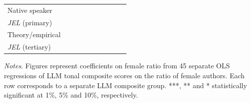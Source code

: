 \begin{table}
\begin{threeparttable}
\begin{tabular}{p{3cm}S@{}S@{}S@{}S@{}S@{}S@{}S@{}S@{}S@{}}
            Native speaker                &               &               &               &               &           {}   &           {}   &           {}   &           {}   &           {}   \\
            \textit{JEL} (primary)        &               &               &               &               &               &               &           {}   &               &               \\
            Theory/empirical              &               &               &               &               &               &               &               &           {}   &               \\
            \textit{JEL} (tertiary)       &               &               &               &               &               &               &               &               &           {}   \\
            \bottomrule
        \end{tabular}
        \begin{tablenotes}
            \tiny
            \item \textit{Notes}. Figures represent coefficients on female ratio from 45 separate OLS regressions of LLM tonal composite scores on the ratio of female authors. Each row corresponds to a separate LLM composite group. ***, ** and * statistically significant at 1\%, 5\% and 10\%, respectively.
        \end{tablenotes}
    \end{threeparttable}
\end{table}